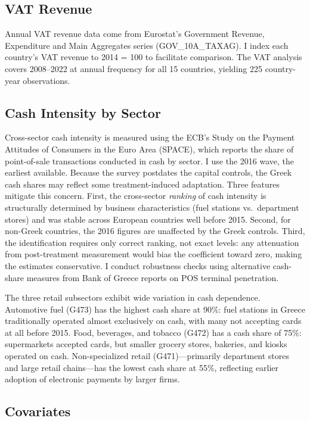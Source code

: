 \documentclass[12pt]{article}
\begin{document}
\subsection{VAT Revenue}

Annual VAT revenue data come from Eurostat's Government Revenue, Expenditure and Main Aggregates series (GOV\_10A\_TAXAG). I index each country's VAT revenue to 2014 = 100 to facilitate comparison. The VAT analysis covers 2008--2022 at annual frequency for all 15 countries, yielding 225 country-year observations.

\subsection{Cash Intensity by Sector}

Cross-sector cash intensity is measured using the ECB's Study on the Payment Attitudes of Consumers in the Euro Area (SPACE), which reports the share of point-of-sale transactions conducted in cash by sector. I use the 2016 wave, the earliest available. Because the survey postdates the capital controls, the Greek cash shares may reflect some treatment-induced adaptation. Three features mitigate this concern. First, the cross-sector \emph{ranking} of cash intensity is structurally determined by business characteristics (fuel stations vs.\ department stores) and was stable across European countries well before 2015. Second, for non-Greek countries, the 2016 figures are unaffected by the Greek controls. Third, the identification requires only correct ranking, not exact levels: any attenuation from post-treatment measurement would bias the coefficient toward zero, making the estimates conservative. I conduct robustness checks using alternative cash-share measures from Bank of Greece reports on POS terminal penetration.

The three retail subsectors exhibit wide variation in cash dependence. Automotive fuel (G473) has the highest cash share at 90\%: fuel stations in Greece traditionally operated almost exclusively on cash, with many not accepting cards at all before 2015. Food, beverages, and tobacco (G472) has a cash share of 75\%: supermarkets accepted cards, but smaller grocery stores, bakeries, and kiosks operated on cash. Non-specialized retail (G471)---primarily department stores and large retail chains---has the lowest cash share at 55\%, reflecting earlier adoption of electronic payments by larger firms.

\subsection{Covariates}
\end{document}
